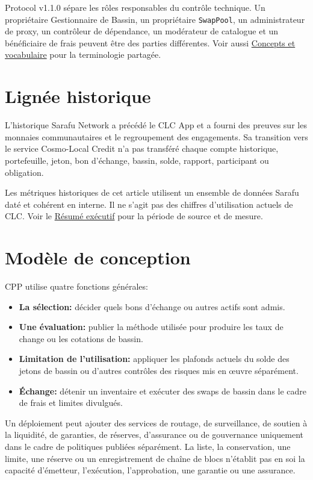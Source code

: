 \documentclass[11pt]{article}
\begin{document}
Protocol v1.1.0 sépare les rôles responsables du contrôle technique. Un propriétaire Gestionnaire de Bassin, un propriétaire \texttt{SwapPool}, un administrateur de proxy, un contrôleur de dépendance, un modérateur de catalogue et un bénéficiaire de frais peuvent être des parties différentes. Voir aussi \href{https://docs.cosmolocal.credit/fr/introduction/concepts}{Concepts et vocabulaire} pour la terminologie partagée.

\section*{Lignée historique}

L'historique Sarafu Network a précédé le CLC App et a fourni des preuves sur les monnaies communautaires et le regroupement des engagements. Sa transition vers le service Cosmo-Local Credit n'a pas transféré chaque compte historique, portefeuille, jeton, bon d'échange, bassin, solde, rapport, participant ou obligation.

Les métriques historiques de cet article utilisent un ensemble de données Sarafu daté et cohérent en interne. Il ne s'agit pas des chiffres d'utilisation actuels de CLC. Voir le \href{https://docs.cosmolocal.credit/fr/white-paper/executive-summary}{Résumé exécutif} pour la période de source et de mesure.

\section*{Modèle de conception}

CPP utilise quatre fonctions générales:

\begin{itemize}[leftmargin=*]
\item \textbf{La sélection:} décider quels bons d'échange ou autres actifs sont admis.
\item \textbf{Une évaluation:} publier la méthode utilisée pour produire les taux de change ou les cotations de bassin.
\item \textbf{Limitation de l'utilisation:} appliquer les plafonds actuels du solde des jetons de bassin ou d'autres contrôles des risques mis en œuvre séparément.
\item \textbf{Échange:} détenir un inventaire et exécuter des swaps de bassin dans le cadre de frais et limites divulgués.
\end{itemize}
Un déploiement peut ajouter des services de routage, de surveillance, de soutien à la liquidité, de garanties, de réserves, d'assurance ou de gouvernance uniquement dans le cadre de politiques publiées séparément. La liste, la conservation, une limite, une réserve ou un enregistrement de chaîne de blocs n'établit pas en soi la capacité d'émetteur, l'exécution, l'approbation, une garantie ou une assurance.
\end{document}
